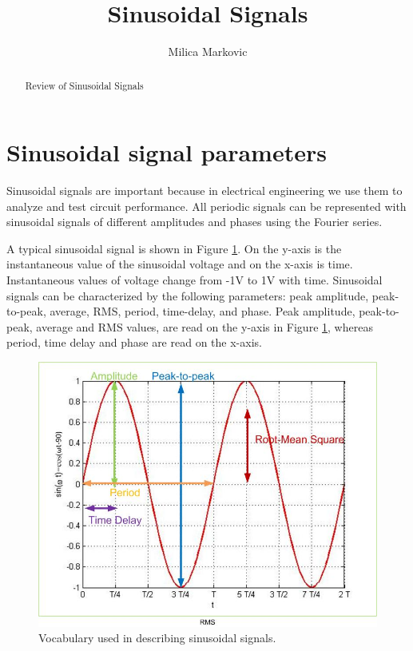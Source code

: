 \documentclass{ximera}
\title{Sinusoidal Signals}
\author{Milica Markovic}
\begin{document}
  
\begin{abstract}  
Review of Sinusoidal Signals
\end{abstract}  
\maketitle

\section{Sinusoidal signal parameters}

Sinusoidal signals are important because in electrical engineering we use them to analyze and test circuit performance. All periodic signals can be represented with sinusoidal signals of different amplitudes and phases using the Fourier series. 

A typical sinusoidal signal is shown in Figure \ref{sinusoid}. On the y-axis is the instantaneous value of the sinusoidal voltage and on the x-axis is time. Instantaneous values of voltage change from -1V to 1V with time. Sinusoidal signals can be characterized by the following parameters: peak amplitude, peak-to-peak, average, RMS, period, time-delay, and phase. Peak amplitude, peak-to-peak, average and RMS values, are read on the y-axis in Figure \ref{sinusoid}, whereas period, time delay and phase are read on the x-axis.

\begin{figure}[htbp]
\begin{center}
\includegraphics[scale=0.4]{jpg/sinusoid.jpg}
\caption{Vocabulary used in describing sinusoidal signals.}
\label{sinusoid}
\end{center}
\end{figure} 
\end{document}
